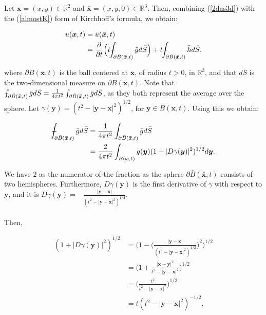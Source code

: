 \documentclass[a4paper, 12pt]{article}
\def\Xint#1{\mathchoice
{\XXint\displaystyle\textstyle{#1}}%
{\XXint\textstyle\scriptstyle{#1}}%
{\XXint\scriptstyle\scriptscriptstyle{#1}}%
{\XXint\scriptscriptstyle\scriptscriptstyle{#1}}%
\!\int}
\def\XXint#1#2#3{{\setbox0=\hbox{$#1{#2#3}{\int}$ }
\vcenter{\hbox{$#2#3$ }}\kern-.6\wd0}}
\def\dashint{\Xint-}
\numberwithin{equation}{section}
\begin{document}
Let $\boldsymbol{x}=(x,y)\in \mathbb{R}^2$ and $\boldsymbol{\bar{x}}=(x,y, 0)\in
\mathbb{R}^3$. Then, combining (\ref{2das3d}) with the (\ref{almostK}) form of
Kirchhoff's formula, we obtain:

\begin{equation} \label{star}
    \begin{aligned}
        u(\boldsymbol{x},t)&=\bar{u}(\boldsymbol{\bar{x}}, t)\\
        &=\diffp[1]{}{t}\Big(t\dashint_{\partial \bar{B}(\boldsymbol{\bar{x}}, t)} \bar{g} d\bar{S}\Big)+t \dashint_{\partial \bar{B}(\boldsymbol{\bar{x}}, t)} \bar{h}d\bar{S},
    \end{aligned}
\end{equation}

where $\partial\bar{B}(\boldsymbol{\bar{x}},t)$ is the ball centered at
$\boldsymbol{\bar{x}}$, of radius $t>0$, in $\mathbb{R}^3$, and that $d\bar{S}$
is the two-dimensional measure on $\partial\bar{B}(\boldsymbol{\bar{x}},t)$.
Note that $\dashint_{\partial \bar{B}(\boldsymbol{\bar{x}}, t)} \bar{g}
d\bar{S}=\frac{1}{4\pi t^2}\int_{\partial \bar{B}(\boldsymbol{\bar{x}},
t)}\bar{g} d\bar{S}$, as they both represent the average over the sphere. Let
$\gamma (\boldsymbol{y})=(t^2-|\boldsymbol{y}-\boldsymbol{x}|^2)^{1/2}$, for
$\boldsymbol{y} \in B(\boldsymbol{x}, t)$. Using this we obtain:

\begin{equation*}
    \begin{aligned}
        \dashint_{\partial \bar{B}(\boldsymbol{\bar{x}}, t)} \bar{g} d\bar{S}&=\frac{1}{4\pi t^2}\int_{\partial \bar{B}(\boldsymbol{\bar{x}}, t)}\bar{g} d\bar{S}\\
        &=\frac{2}{4 \pi t^2} \int_{B(\boldsymbol{x}, t)} g(\boldsymbol{y})(1+|D\gamma (\boldsymbol{y})|^2)^{1/2}d\boldsymbol{y}.
    \end{aligned}
\end{equation*}

We have $2$ as the numerator of the fraction as the sphere
$\partial\bar{B}(\boldsymbol{\bar{x}}, t)$ consists of two hemispheres.
Furthermore, $D\gamma (\boldsymbol{y})$ is the first derivative of $\gamma$ with
respect to $\boldsymbol{y}$, and it is $D\gamma
(\boldsymbol{y})=-\frac{|\boldsymbol{y}-\boldsymbol{x}|}{(t^2-|\boldsymbol{y}-\boldsymbol{x}|^2)^{1/2}}$.
\\
\\

Then,

\begin{equation*}
    \begin{aligned}
        (1+|D\gamma (\boldsymbol{y})|^2)^{1/2}&=\Big(1-\Big(\frac{|\boldsymbol{y}-\boldsymbol{x}|}{(t^2-|\boldsymbol{y}-\boldsymbol{x}|^2)^{1/2}}\Big)^2\Big)^{1/2}\\
        &=\Big(1+\frac{|\boldsymbol{x}-\boldsymbol{y}|^2}{t^2-|\boldsymbol{y}-\boldsymbol{x}|^2}\Big)^{1/2}\\
        &=\Big(\frac{t^2}{t^2-|\boldsymbol{y}-\boldsymbol{x}|^2}\Big)^{1/2}\\
        &=t(t^2-|\boldsymbol{y}-\boldsymbol{x}|^2)^{-1/2}.
    \end{aligned}
\end{equation*}
\end{document}
